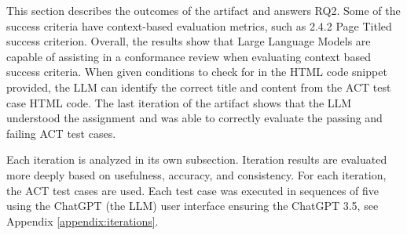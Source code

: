 This section describes the outcomes of the artifact and answers RQ2. Some of the success criteria have context-based evaluation metrics, such as 2.4.2 Page Titled success criterion. Overall, the results show that Large Language Models are capable of assisting in a conformance review when evaluating context based success criteria. When given conditions to check for in the HTML code snippet provided, the LLM can identify the correct title and content from the ACT test case HTML code. The last iteration of the artifact shows that the LLM understood the assignment and was able to correctly evaluate the passing and failing ACT test cases.

Each iteration is analyzed in its own subsection. Iteration results are evaluated more deeply based on usefulness, accuracy, and consistency. For each iteration, the \textcite{act_rule_g88} ACT test cases are used. Each test case was executed in sequences of five using the ChatGPT (the LLM) user interface ensuring the ChatGPT 3.5, see Appendix \ref{appendix:iterations}. 

